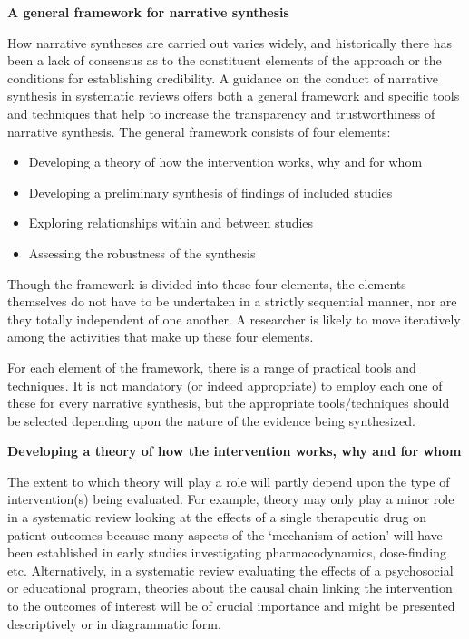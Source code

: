 \documentclass[
  11pt,
  a4paper,
  DIV=11,
  numbers=noendperiod]{scrreprt}
\begin{document}
\textbf{A general framework for narrative synthesis}

How narrative syntheses are carried out varies widely, and historically
there has been a lack of consensus as to the constituent elements of the
approach or the conditions for establishing credibility. A guidance on
the conduct of narrative synthesis in systematic reviews offers both a
general framework and specific tools and techniques that help to
increase the transparency and trustworthiness of narrative synthesis.
The general framework consists of four elements:

\begin{itemize}
\item
  Developing a theory of how the intervention works, why and for whom
\item
  Developing a preliminary synthesis of findings of included studies
\item
  Exploring relationships within and between studies
\item
  Assessing the robustness of the synthesis
\end{itemize}

Though the framework is divided into these four elements, the elements
themselves do not have to be undertaken in a strictly sequential manner,
nor are they totally independent of one another. A researcher is likely
to move iteratively among the activities that make up these four
elements.

For each element of the framework, there is a range of practical tools
and techniques. It is not mandatory (or indeed appropriate) to employ
each one of these for every narrative synthesis, but the appropriate
tools/techniques should be selected depending upon the nature of the
evidence being synthesized.

\textbf{Developing a theory of how the intervention works, why and for
whom}

The extent to which theory will play a role will partly depend upon the
type of intervention(s) being evaluated. For example, theory may only
play a minor role in a systematic review looking at the effects of a
single therapeutic drug on patient outcomes because many aspects of the
`mechanism of action' will have been established in early studies
investigating pharmacodynamics, dose-finding etc. Alternatively, in a
systematic review evaluating the effects of a psychosocial or
educational program, theories about the causal chain linking the
intervention to the outcomes of interest will be of crucial importance
and might be presented descriptively or in diagrammatic form.
\end{document}

